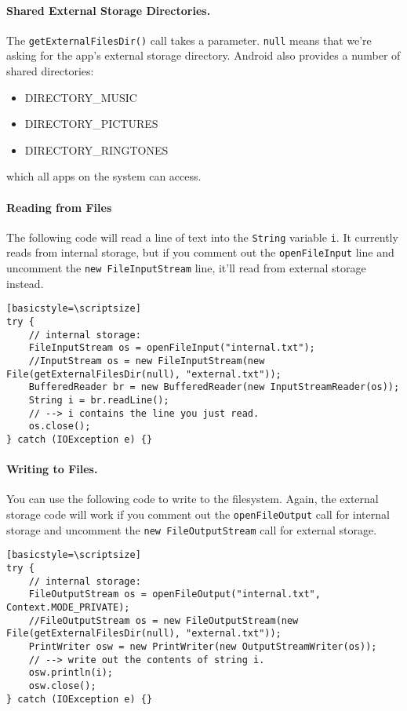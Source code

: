 \paragraph{Shared External Storage Directories.}
The {\tt getExternalFilesDir()} call takes a parameter.
{\tt null} means that we're asking for the app's external
storage directory. Android also provides a number of shared directories:
\begin{itemize}
\item DIRECTORY\_MUSIC
\item DIRECTORY\_PICTURES
\item DIRECTORY\_RINGTONES
\end{itemize}
which all apps on the system can access.


\paragraph{Reading from Files} The following code will read a line of text
into the {\tt String} variable {\tt i}. It currently reads from internal
storage, but if you comment out the {\tt openFileInput} line and uncomment
the {\tt new FileInputStream} line, it'll read from external storage instead.

\begin{verbatim}[basicstyle=\scriptsize]
try {
    // internal storage: 
    FileInputStream os = openFileInput("internal.txt");
    //InputStream os = new FileInputStream(new File(getExternalFilesDir(null), "external.txt"));
    BufferedReader br = new BufferedReader(new InputStreamReader(os));
    String i = br.readLine();
    // --> i contains the line you just read.
    os.close();
} catch (IOException e) {}
\end{verbatim}

\paragraph{Writing to Files.} You can use the following code to write to
the filesystem. Again, the external storage code will work if you
comment out the {\tt openFileOutput} call for internal storage and uncomment the 
{\tt new FileOutputStream} call for external storage.
\begin{verbatim}[basicstyle=\scriptsize]
try {
    // internal storage:
    FileOutputStream os = openFileOutput("internal.txt", Context.MODE_PRIVATE);
    //FileOutputStream os = new FileOutputStream(new File(getExternalFilesDir(null), "external.txt"));
    PrintWriter osw = new PrintWriter(new OutputStreamWriter(os));
    // --> write out the contents of string i.
    osw.println(i);
    osw.close();
} catch (IOException e) {}
\end{verbatim}



